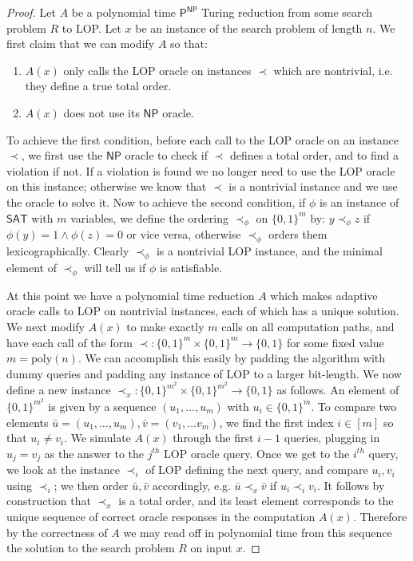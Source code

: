 \documentclass[11pt]{article}
\newcommand{\B}{\{0,1\}}
\begin{document}
\begin{proof}
Let $A$ be a polynomial time $\mathsf{P^{NP}}$ Turing reduction from some search problem $R$ to LOP. Let $x$ be an instance of the search problem of length $n$. We first claim that we can modify $A$ so that:
\begin{enumerate}
    \item $A(x)$ only calls the LOP oracle on instances $\prec$ which are nontrivial, i.e. they define a true total order.
    \item $A(x)$ does not use its $\mathsf{NP}$ oracle.
\end{enumerate}
To achieve the first condition, before each call to the LOP oracle on an instance $\prec$, we first use the $\mathsf{NP}$ oracle to check if $\prec$ defines a total order, and to find a violation if not. If a violation is found we no longer need to use the LOP oracle on this instance; otherwise we know that $\prec$ is a nontrivial instance and we use the oracle to solve it. Now to achieve the second condition, if $\phi$ is an instance of $\mathsf{SAT}$ with $m$ variables, we define the ordering $\prec_{\phi}$ on $\B^m$ by: $y \prec_{\phi} z$ if $\phi(y) = 1 \land \phi(z)=0$ or vice versa, otherwise $\prec_{\phi}$ orders them lexicographically. Clearly $\prec_{\phi}$ is a nontrivial LOP instance, and the minimal element of $\prec_{\phi}$ will tell us if $\phi$ is satisfiable.

At this point we have a polynomial time reduction $A$ which makes adaptive oracle calls to LOP on nontrivial instances, each of which has a unique solution. We next modify $A(x)$ to make exactly $m$ calls on all computation paths, and have each call of the form $\prec: \B^m \times \B^m \to \B$ for some fixed value $m = \mathrm{poly}(n)$. We can accomplish this easily by padding the algorithm with dummy queries and padding any instance of LOP to a larger bit-length. We now define a new instance $\prec_{x}: \B^{m^2} \times \B^{m^2} \to \B$ as follows. An element of $\B^{m^2}$ is given by a sequence $(u_1,\ldots,u_m)$ with $u_i \in \B^m$. To compare two elements $\bar{u} = (u_1,\ldots,u_m), \bar{v}= (v_1,\ldots v_m)$, we find the first index $i \in [m]$ so that $u_i \neq v_i$. We simulate $A(x)$ through the first $i-1$ queries, plugging in $u_j = v_j$ as the answer to the $j^{th}$ LOP oracle query. Once we get to the $i^{th}$ query, we look at the instance $\prec_i$ of LOP defining the next query, and compare $u_i, v_i$ using $\prec_i$; we then order $\bar{u},\bar{v}$ accordingly, e.g. $\bar{u} \prec_x \bar{v}$ if $u_i \prec_i v_i$. It follows by construction that $\prec_x$ is a total order, and its least element  corresponds to the unique sequence of correct oracle responses in the computation $A(x)$. Therefore by the correctness of $A$ we may read off in polynomial time from this sequence the solution to the search problem $R$ on input $x$.
\end{proof}
\end{document}
